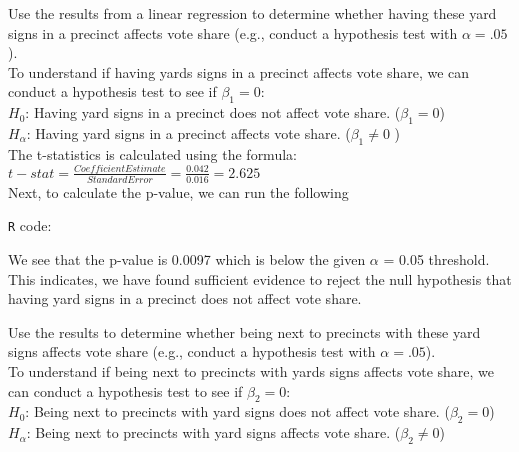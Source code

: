 \documentclass[12pt,letterpaper]{article}
\begin{document}
\vspace{.5cm}

\begin{enumerate}
	\item [(a)] Use the results from a linear regression to determine whether having these yard signs in a precinct affects vote share (e.g., conduct a hypothesis test with $\alpha = .05$).\\
	
	To understand if having yards signs in a precinct affects vote share, we can conduct a hypothesis test to see if $\beta_1 = 0$:\\
	
	$H_0$: Having yard signs in a precinct does not affect vote share. ($\beta_1 = 0$)\\
	$H_\alpha$: Having yard signs in a precinct affects vote share. ($\beta_1 \neq 0$ )\\
	
	The t-statistics is calculated using the formula:\\ 
	$t-stat = \frac{Coefficient Estimate}{Standard Error} = \frac{0.042}{0.016} = 2.625$\\

	Next, to calculate the p-value, we can run the following {\texttt{R} code:
	
	
	We see that the p-value is 0.0097 which is below the given $\alpha$ = 0.05 threshold. This indicates, we have found sufficient evidence to reject the null hypothesis that having yard signs in a precinct does not affect vote share.
	
	\vspace*{.5cm}
	
	\item [(b)]  Use the results to determine whether being
	next to precincts with these yard signs affects vote
	share (e.g., conduct a hypothesis test with $\alpha = .05$).\\
	
	To understand if being next to precincts with yards signs affects vote share, we can conduct a hypothesis test to see if $\beta_2 = 0$:\\
	
	$H_0$: Being next to precincts with yard signs does not affect vote share. ($\beta_2 = 0$)\\
	$H_\alpha$: Being next to precincts with yard signs affects vote share. ($\beta_2 \neq 0$)\\
	
}
\end{enumerate}
\end{document}
